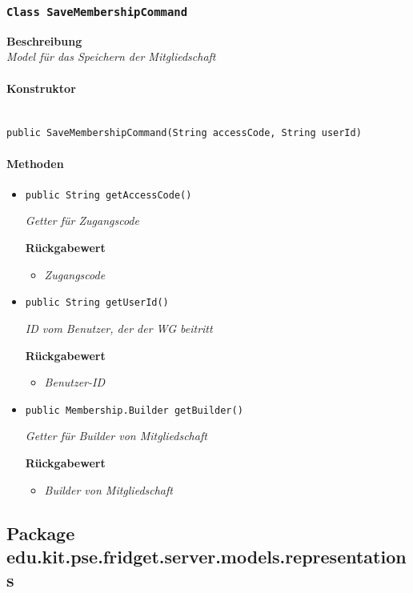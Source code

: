      \subsubsection{\texttt{Class SaveMembershipCommand}}
     \textbf{Beschreibung} \\
     \textit{Model für das Speichern der Mitgliedschaft}
     \paragraph*{Konstruktor}\mbox{} \\
     \texttt{public SaveMembershipCommand(String accessCode, String userId)}
     \paragraph*{Methoden}
     \begin{itemize}
     	\item{\texttt{public String getAccessCode()}}
     	
     	\textit{Getter für Zugangscode}
     	
     	\textbf{Rückgabewert}
     	\begin{itemize}
     		\item\textit{Zugangscode}
     	\end{itemize}
     
     \item{\texttt{public String getUserId()}}
     	
     	\textit{ID vom Benutzer, der der WG beitritt}
     	
     	\textbf{Rückgabewert}
     	\begin{itemize}
     		\item\textit{Benutzer-ID}
     	\end{itemize}
     
     \item{\texttt{public Membership.Builder getBuilder()}}
     	
     	\textit{Getter für Builder von Mitgliedschaft}
     	
     	\textbf{Rückgabewert}
     	\begin{itemize}
     		\item\textit{Builder von Mitgliedschaft}
     	\end{itemize}
     \end{itemize}
 \newpage
     \subsection{Package edu.kit.pse.fridget.server.models.representations}
